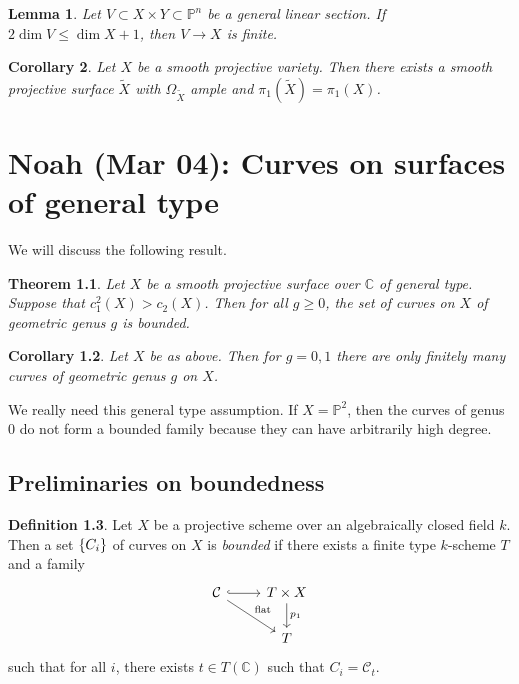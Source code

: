 \documentclass[leqno, openany]{memoir}
\newtheorem{thm}{Theorem}[section]
\newtheorem{cor}[thm]{Corollary}
\newtheorem{lem}[thm]{Lemma}
\theoremstyle{definition}
\newtheorem{defn}[thm]{Definition}
\theoremstyle{remark}
\theoremstyle{plain}
\theoremstyle{definition}
\theoremstyle{remark}
\newcommand{\C}{\mathbb{C}}
\renewcommand{\P}{\mathbb{P}}
\newcommand{\mc}[1]{\mathcal{#1}}
\newcommand{\wt}[1]{\widetilde{#1}}
\begin{document}
\begin{lem}
    Let $V \subset X \times Y \subset \P^n$ be a general linear section. If $2 \dim V \leq \dim X + 1$, then $V \to X$ is finite.
\end{lem}

\begin{cor}
    Let $X$ be a smooth projective variety. Then there exists a smooth projective surface $\wt{X}$ with $\Omega_{\wt{X}}$ ample and $\pi_1(\wt{X}) = \pi_1(X)$.
\end{cor}

\chapter{Noah (Mar 04): Curves on surfaces of general type}%

We will discuss the following result.

\begin{thm}
    Let $X$ be a smooth projective surface over $\C$ of general type. Suppose that $c_1^2(X) > c_2(X)$. Then for all $g \geq 0$, the set of curves on $X$ of geometric genus $g$ is bounded.
\end{thm}

\begin{cor}
    Let $X$ be as above. Then for $g = 0,1$ there are only finitely many curves of geometric genus $g$ on $X$.
\end{cor}

We really need this general type assumption. If $X = \P^2$, then the curves of genus $0$ do not form a bounded family because they can have arbitrarily high degree.

\section{Preliminaries on boundedness}

\begin{defn}
    Let $X$ be a projective scheme over an algebraically closed field $k$. Then a set $\qty{C_i}$ of curves on $X$ is \textit{bounded} if there exists a finite type $k$-scheme $T$ and a family
    \begin{equation*}
    \begin{tikzcd}
        \mc{C} \ar[hookrightarrow]{r} \ar{dr}{\text{flat}} & T \times X \ar{d}{p_1} \\
        & T
    \end{tikzcd}
    \end{equation*}
    such that for all $i$, there exists $t \in T(\C)$ such that $C_i = \mc{C}_t$.
\end{defn}
\end{document}

